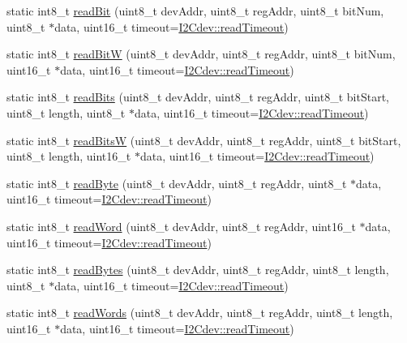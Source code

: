 \begin{DoxyCompactItemize}
\item 
static int8\+\_\+t \hyperlink{class_i2_cdev_abe6d8ea07027d362419de86188981559}{read\+Bit} (uint8\+\_\+t dev\+Addr, uint8\+\_\+t reg\+Addr, uint8\+\_\+t bit\+Num, uint8\+\_\+t $\ast$data, uint16\+\_\+t timeout=\hyperlink{class_i2_cdev_ae2125796e0948127fc15031650111e82}{I2\+Cdev\+::read\+Timeout})
\item 
static int8\+\_\+t \hyperlink{class_i2_cdev_aaaa3b9ef9500a7d69ccc3d0ccaae33c4}{read\+Bit\+W} (uint8\+\_\+t dev\+Addr, uint8\+\_\+t reg\+Addr, uint8\+\_\+t bit\+Num, uint16\+\_\+t $\ast$data, uint16\+\_\+t timeout=\hyperlink{class_i2_cdev_ae2125796e0948127fc15031650111e82}{I2\+Cdev\+::read\+Timeout})
\item 
static int8\+\_\+t \hyperlink{class_i2_cdev_a8e5e9742072bb80db06ccd46f52e2b6d}{read\+Bits} (uint8\+\_\+t dev\+Addr, uint8\+\_\+t reg\+Addr, uint8\+\_\+t bit\+Start, uint8\+\_\+t length, uint8\+\_\+t $\ast$data, uint16\+\_\+t timeout=\hyperlink{class_i2_cdev_ae2125796e0948127fc15031650111e82}{I2\+Cdev\+::read\+Timeout})
\item 
static int8\+\_\+t \hyperlink{class_i2_cdev_a1f417ba3e5ce99832e07c31522c97f87}{read\+Bits\+W} (uint8\+\_\+t dev\+Addr, uint8\+\_\+t reg\+Addr, uint8\+\_\+t bit\+Start, uint8\+\_\+t length, uint16\+\_\+t $\ast$data, uint16\+\_\+t timeout=\hyperlink{class_i2_cdev_ae2125796e0948127fc15031650111e82}{I2\+Cdev\+::read\+Timeout})
\item 
static int8\+\_\+t \hyperlink{class_i2_cdev_ad3fb41ce124a29f93749d99611c75c33}{read\+Byte} (uint8\+\_\+t dev\+Addr, uint8\+\_\+t reg\+Addr, uint8\+\_\+t $\ast$data, uint16\+\_\+t timeout=\hyperlink{class_i2_cdev_ae2125796e0948127fc15031650111e82}{I2\+Cdev\+::read\+Timeout})
\item 
static int8\+\_\+t \hyperlink{class_i2_cdev_a545cd48b1e806e7e467b542c9e38e8c8}{read\+Word} (uint8\+\_\+t dev\+Addr, uint8\+\_\+t reg\+Addr, uint16\+\_\+t $\ast$data, uint16\+\_\+t timeout=\hyperlink{class_i2_cdev_ae2125796e0948127fc15031650111e82}{I2\+Cdev\+::read\+Timeout})
\item 
static int8\+\_\+t \hyperlink{class_i2_cdev_aca9c503da5cffd6ac6f8eff9b195c5f4}{read\+Bytes} (uint8\+\_\+t dev\+Addr, uint8\+\_\+t reg\+Addr, uint8\+\_\+t length, uint8\+\_\+t $\ast$data, uint16\+\_\+t timeout=\hyperlink{class_i2_cdev_ae2125796e0948127fc15031650111e82}{I2\+Cdev\+::read\+Timeout})
\item 
static int8\+\_\+t \hyperlink{class_i2_cdev_a1b3d895dc6a00cbb5fb3b0441b2e35de}{read\+Words} (uint8\+\_\+t dev\+Addr, uint8\+\_\+t reg\+Addr, uint8\+\_\+t length, uint16\+\_\+t $\ast$data, uint16\+\_\+t timeout=\hyperlink{class_i2_cdev_ae2125796e0948127fc15031650111e82}{I2\+Cdev\+::read\+Timeout})

\end{DoxyCompactItemize}
